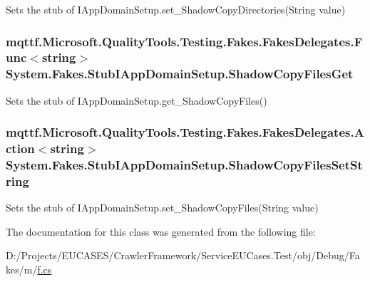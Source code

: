 Sets the stub of I\-App\-Domain\-Setup.\-set\-\_\-\-Shadow\-Copy\-Directories(\-String value)

\hypertarget{class_system_1_1_fakes_1_1_stub_i_app_domain_setup_a46431d7497bf0f200cb915529ae71908}{
\subsubsection[{Shadow\-Copy\-Files\-Get}]{\setlength{\rightskip}{0pt plus 5cm}mqttf.\-Microsoft.\-Quality\-Tools.\-Testing.\-Fakes.\-Fakes\-Delegates.\-Func$<$string$>$ System.\-Fakes.\-Stub\-I\-App\-Domain\-Setup.\-Shadow\-Copy\-Files\-Get}}\label{class_system_1_1_fakes_1_1_stub_i_app_domain_setup_a46431d7497bf0f200cb915529ae71908}


Sets the stub of I\-App\-Domain\-Setup.\-get\-\_\-\-Shadow\-Copy\-Files()

\hypertarget{class_system_1_1_fakes_1_1_stub_i_app_domain_setup_a512f4b127967852464a8afd73e1aadad}{
\subsubsection[{Shadow\-Copy\-Files\-Set\-String}]{\setlength{\rightskip}{0pt plus 5cm}mqttf.\-Microsoft.\-Quality\-Tools.\-Testing.\-Fakes.\-Fakes\-Delegates.\-Action$<$string$>$ System.\-Fakes.\-Stub\-I\-App\-Domain\-Setup.\-Shadow\-Copy\-Files\-Set\-String}}\label{class_system_1_1_fakes_1_1_stub_i_app_domain_setup_a512f4b127967852464a8afd73e1aadad}


Sets the stub of I\-App\-Domain\-Setup.\-set\-\_\-\-Shadow\-Copy\-Files(\-String value)



The documentation for this class was generated from the following file\-:\begin{DoxyCompactItemize}
\item 
D\-:/\-Projects/\-E\-U\-C\-A\-S\-E\-S/\-Crawler\-Framework/\-Service\-E\-U\-Cases.\-Test/obj/\-Debug/\-Fakes/m/\hyperlink{m_2f_8cs}{f.\-cs}\end{DoxyCompactItemize}
